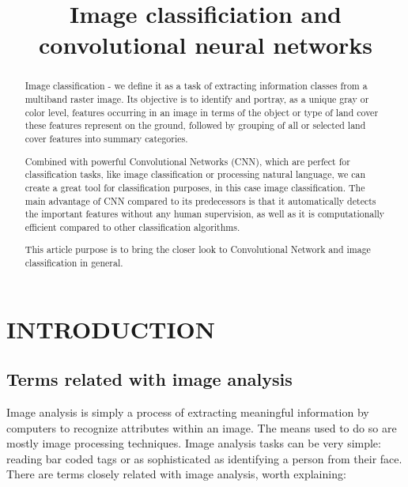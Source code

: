 \documentclass[conference]{IEEEtran}
\begin{document}
\title{\LARGE \bf Image classificiation and convolutional neural networks}

\author{
}



\maketitle
\thispagestyle{empty}
\pagestyle{empty}


\begin{abstract}
Image classification - we define it as a task of extracting information classes from a multiband raster image. Its objective is to identify and portray, as a unique gray or color level, features occurring in an image in terms of the object or type of land cover these features represent on the ground, followed by grouping of all or selected land cover features into summary categories.

Combined with powerful Convolutional Networks (CNN), which are perfect for classification tasks, like image classification or processing natural language, we can create a great tool for classification purposes, in this case image classification. The main advantage of CNN compared to its predecessors is that it automatically detects the important features without any human supervision, as well as it is computationally efficient compared to other classification algorithms.

This article purpose is to bring the closer look to Convolutional Network and image classification in general.
\end{abstract}


\section{INTRODUCTION}
\subsection{Terms related with image analysis}
Image analysis is simply a process of extracting meaningful information by computers to recognize attributes within an image. The means used to do so are mostly image processing techniques. Image analysis tasks can be very simple: reading bar coded tags or as sophisticated as identifying a person from their face. There are terms closely related with image analysis, worth explaining:
\\
\end{document}
